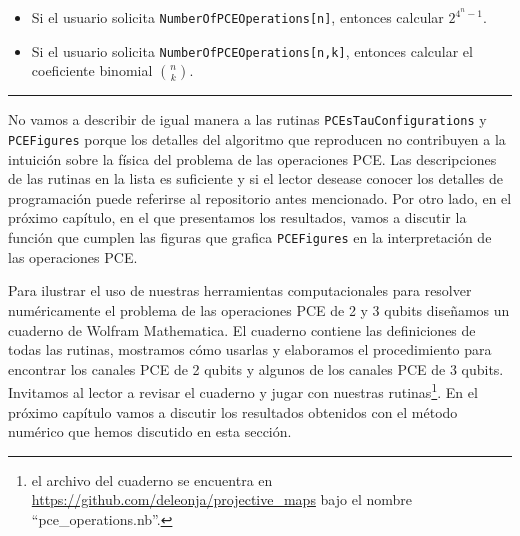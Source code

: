 \begin{itemize}
	\item Si el usuario solicita 	\texttt{NumberOfPCEOperations[n]}, entonces
	calcular $2^{4^n-1}$.
	\item Si el usuario solicita 	\texttt{NumberOfPCEOperations[n,k]}, entonces 
	calcular el coeficiente binomial $\binom{n}{k}$.
\end{itemize}
\vspace{-.5cm}
\noindent\rule{\textwidth}{1mm}
No vamos a describir de igual manera a las rutinas 
\texttt{PCEsTauConfigurations} y \texttt{PCEFigures} porque los 
detalles del algoritmo que reproducen no contribuyen a la intuición 
sobre la física del problema de las operaciones PCE. Las
descripciones de las rutinas en la lista es suficiente y si el lector desease 
conocer los detalles de programación puede referirse al 
repositorio antes mencionado. Por otro lado, en el próximo capítulo, 
en el que presentamos los resultados, vamos a discutir la función
que cumplen las figuras que grafica \texttt{PCEFigures} en la interpretación
de las operaciones PCE.

Para ilustrar el uso de nuestras herramientas computacionales para resolver
numéricamente el problema de las operaciones PCE de 2 y 3 qubits diseñamos 
un cuaderno de Wolfram Mathematica. El cuaderno contiene las 
definiciones de todas las rutinas, mostramos cómo usarlas 
y elaboramos el procedimiento para encontrar los canales PCE 
de 2 qubits y algunos de los canales PCE de 3 qubits. Invitamos al 
lector a revisar el cuaderno y jugar con nuestras rutinas\footnote{
el archivo del cuaderno se encuentra en
\href{https://github.com/deleonja/projective_maps}
{https://github.com/deleonja/projective\_maps} bajo el nombre 
``pce\_operations.nb''.}. En el próximo capítulo vamos a discutir 
los resultados obtenidos con el método numérico que hemos 
discutido en esta sección.

\newpage


%


